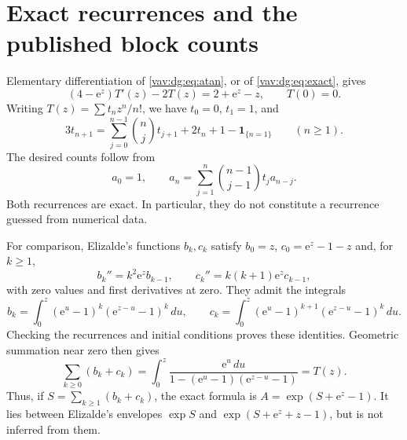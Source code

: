 \documentclass[11pt]{article}
\theoremstyle{remark}\newtheorem{remark}[theorem]{Remark}
\newcommand{\ee}{\mathrm e}
\begin{document}
\section{Exact recurrences and the published block counts}\label{vav:dg:sec:recurrences}
Elementary differentiation of \eqref{vav:dg:eq:atan}, or of \eqref{vav:dg:eq:exact}, gives
\begin{equation}\label{vav:dg:eq:ode}
 (4-\ee^z)T'(z)-2T(z)=2+\ee^z-z,\qquad T(0)=0.
\end{equation}
Writing $T(z)=\sum t_nz^n/n!$, we have $t_0=0$, $t_1=1$, and
\begin{equation}\label{vav:dg:eq:rec-t}
 3t_{n+1}=\sum_{j=0}^{n-1}\binom nj t_{j+1}+2t_n+1-\mathbf1_{\{n=1\}}
 \qquad(n\ge1).
\end{equation}
The desired counts follow from
\begin{equation}\label{vav:dg:eq:rec-a}
 a_0=1,\qquad
 a_n=\sum_{j=1}^n\binom{n-1}{j-1}t_ja_{n-j}.
\end{equation}
Both recurrences are exact. In particular, they do not constitute a
recurrence guessed from numerical data.

For comparison, Elizalde's functions $b_k,c_k$ satisfy
$b_0=z$, $c_0=\ee^z-1-z$ and, for $k\ge1$,
\[
 b_k''=k^2\ee^zb_{k-1},\qquad
 c_k''=k(k+1)\ee^zc_{k-1},
\]
with zero values and first derivatives at zero. They admit the integrals
\[
 b_k=\int_0^z(\ee^u-1)^k(\ee^{z-u}-1)^k\,du,\qquad
 c_k=\int_0^z(\ee^u-1)^{k+1}(\ee^{z-u}-1)^k\,du.
\]
Checking the recurrences and initial conditions proves these identities.
Geometric summation near zero then gives
\begin{equation}\label{vav:dg:eq:T-block}
 \sum_{k\ge0}(b_k+c_k)
 =\int_0^z\frac{\ee^u\,du}
          {1-(\ee^u-1)(\ee^{z-u}-1)}=T(z).
\end{equation}
Thus, if $S=\sum_{k\ge1}(b_k+c_k)$, the exact formula is
$A=\exp(S+\ee^z-1)$. It lies between Elizalde's envelopes
$\exp S$ and $\exp(S+\ee^z+z-1)$, but is not inferred from them.
\end{document}
